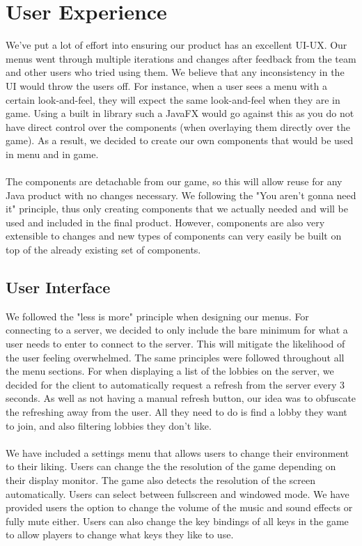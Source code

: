 \documentclass[12pt]{article}
\newcommand{\return}{\\\\\noindent}
\begin{document}
\section{User Experience}
We've put a lot of effort into ensuring our product has an excellent UI-UX. Our menus went through multiple iterations and changes after feedback from the team and other users who tried using them. We believe that any inconsistency in the UI would throw the users off. For instance, when a user sees a menu with a certain look-and-feel, they will expect the same look-and-feel when they are in game. Using a built in library such a JavaFX would go against this as you do not have direct control over the components (when overlaying them directly over the game). As a result, we decided to create our own components that would be used in menu and in game.\return
The components are detachable from our game, so this will allow reuse for any Java product with no changes necessary. We following the "You aren't gonna need it" principle, thus only creating components that we actually needed and will be used and included in the final product. However, components are also very extensible to changes and new types of components can very easily be built on top of the already existing set of components.
\subsection{User Interface}
We followed the "less is more" principle when designing our menus. For connecting to a server, we decided to only include the bare minimum for what a user needs to enter to connect to the server. This will mitigate the likelihood of the user feeling overwhelmed. The same principles were followed throughout all the menu sections. For when displaying a list of the lobbies on the server, we decided for the client to automatically request a refresh from the server every 3 seconds. As well as not having a manual refresh button, our idea was to obfuscate the refreshing away from the user. All they need to do is find a lobby they want to join, and also filtering lobbies they don't like.\return
We have included a settings menu that allows users to change their environment to their liking. Users can change the the resolution of the game depending on their display monitor. The game also detects the resolution of the screen automatically. Users can select between fullscreen and windowed mode. We have provided users the option to change the volume of the music and sound effects or fully mute either. Users can also change the key bindings of all keys in the game to allow players to change what keys they like to use.
\end{document}
